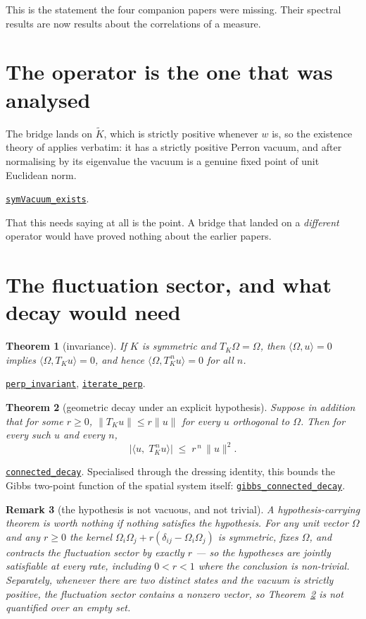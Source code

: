\documentclass[11pt]{article}
\newtheorem{theorem}{Theorem}[section]
\newtheorem{remark}[theorem]{Remark}
\theoremstyle{definition}
\newcommand{\anchor}{c4fa6a9e6769496a7270981ef0908b2d644c230b}
\newcommand{\osline}[3]{%
  \href{https://github.com/lluiseriksson/THE-ERIKSSON-PROGRAMME/blob/\anchor/YangMills/OS/#1.lean\#L#2}{\nolinkurl{#3}}}
\newcommand{\Om}{\Omega}
\begin{document}
This is the statement the four companion papers were missing.  Their spectral
results are now results about the correlations of a measure.

\section{The operator is the one that was analysed}\label{sec:vacuum}

The bridge lands on $\widetilde K$, which is strictly positive whenever $w$ is,
so the existence theory of \cite{ErikssonPerron} applies verbatim: it has a
strictly positive Perron vacuum, and after normalising by its eigenvalue the
vacuum is a genuine fixed point of unit Euclidean norm.

\osline{SpatialGibbs}{303}{symVacuum\_exists}.

That this needs saying at all is the point.  A bridge that landed on a
\emph{different} operator would have proved nothing about the earlier papers.

\section{The fluctuation sector, and what decay would need}\label{sec:decay}

\begin{theorem}[invariance]\label{thm:perp}
If $K$ is symmetric and $T_K\Om=\Om$, then $\langle\Om,u\rangle=0$ implies
$\langle\Om,T_Ku\rangle=0$, and hence $\langle\Om,T_K^{\,n}u\rangle=0$ for all
$n$.
\end{theorem}

\osline{SpatialGibbs}{369}{perp\_invariant},
\osline{SpatialGibbs}{375}{iterate\_perp}.

\begin{theorem}[geometric decay under an explicit hypothesis]\label{thm:decay}
Suppose in addition that for some $r\ge0$,
$\|T_Ku\|\le r\|u\|$ for every $u$ orthogonal to $\Om$.  Then for every such
$u$ and every $n$,
\[
  \bigl|\langle u,\;T_K^{\,n}u\rangle\bigr|\;\le\;r^{\,n}\,\|u\|^{2}.
\]
\end{theorem}

\osline{SpatialGibbs}{405}{connected\_decay}.
Specialised through the dressing identity, this bounds the Gibbs two-point
function of the spatial system itself:
\osline{SpatialGibbs}{528}{gibbs\_connected\_decay}.

\begin{remark}[the hypothesis is not vacuous, and not trivial]\label{rem:nonvac}
A hypothesis-carrying theorem is worth nothing if nothing satisfies the
hypothesis.  For any unit vector $\Om$ and any $r\ge0$ the kernel
$\Om_i\Om_j+r(\delta_{ij}-\Om_i\Om_j)$ is symmetric, fixes $\Om$, and contracts
the fluctuation sector by exactly $r$ --- so the hypotheses are jointly
satisfiable at every rate, including $0<r<1$ where the conclusion is
non-trivial.  Separately, whenever there are two distinct states and the vacuum
is strictly positive, the fluctuation sector contains a nonzero vector, so
Theorem~\ref{thm:decay} is not quantified over an empty set.
\end{remark}
\end{document}

